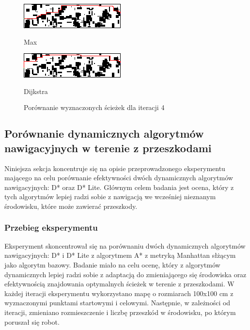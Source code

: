 \documentclass[12pt,twoside]{article}
\begin{document}
\begin{figure}[ht]
	\begin{minipage}{0.4\textwidth}
        \centering
        \includegraphics[width=\linewidth]{figures/static_algo/map_astar_max_4.png}
        \caption*{Max}
        \label{fig:map_astar_max_4}
    \end{minipage}    
    \hspace{0.1\textwidth}
    \begin{minipage}{0.4\textwidth}
        \centering
        \includegraphics[width=\linewidth]{figures/static_algo/map_dijkstra_4.png}
        \caption*{Dijkstra}
        \label{fig:map_dijkstra_4}
    \end{minipage}
    \caption{Porównanie wyznaczonych ścieżek dla iteracji 4}
    \label{fig:comparison_iteration_4}
\end{figure}
%

\subsection{Porównanie dynamicznych algorytmów nawigacyjnych w terenie z przeszkodami}
Niniejsza sekcja koncentruje się na opisie przeprowadzonego eksperymentu mającego na celu porównanie efektywności dwóch dynamicznych algorytmów nawigacyjnych: D* oraz D* Lite. Głównym celem badania jest ocena, który z tych algorytmów lepiej radzi sobie z nawigacją we wcześniej nieznanym środowisku, które może zawierać przeszkody.

\subsubsection{Przebieg eksperymentu}
Eksperyment skoncentrował się na porównaniu dwóch dynamicznych algorytmów nawigacyjnych: D* i D* Lite z algorytmem A* z metryką Manhattan słżącym jako algorytm bazowy. Badanie miało na celu ocenę, który z algorytmów dynamicznych lepiej radzi sobie z adaptacją do zmieniającego się środowiska oraz efektywnością znajdowania optymalnych ścieżek w terenie z przeszkodami. W każdej iteracji eksperymentu wykorzystano mapę o rozmiarach 100x100 cm z wyznaczonymi punktami startowymi i celowymi. Następnie, w zależności od iteracji, zmieniano rozmieszczenie i liczbę przeszkód w środowisku, po którym poruszał się robot.
\end{document}
